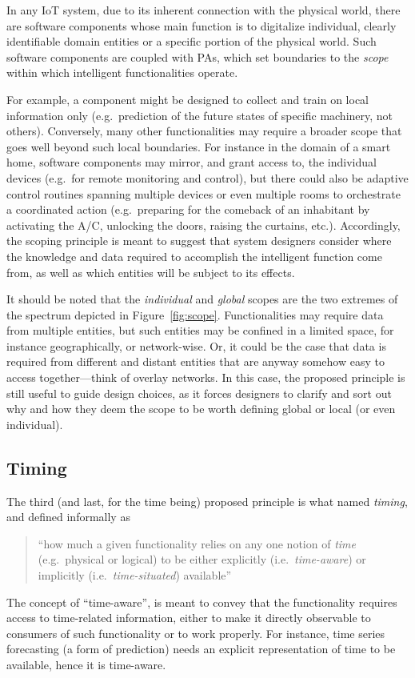 In any IoT system, due to its inherent connection with the physical world, there are software components whose main function 
is to digitalize individual, clearly identifiable domain entities or a specific portion of the physical world. 
Such software components 
are coupled with PAs, which set boundaries to the \emph{scope} within which intelligent functionalities operate. 

For example, a component might be designed to collect and train on local information only (e.g.\ prediction of the future states of specific machinery, not others). 
%
Conversely, many other functionalities may require a broader scope that goes well beyond such local boundaries. 
For instance in the domain of a smart home,
software components may mirror, and grant access to, the individual devices (e.g.\ for remote monitoring and control), 
but there could also be adaptive control routines spanning multiple devices or even multiple rooms to orchestrate a coordinated action (e.g.\ preparing for the comeback of an inhabitant by activating the A/C, unlocking the doors, raising the curtains, etc.). 
%
Accordingly, the scoping principle is meant to suggest that system designers consider where the knowledge and data required to accomplish the intelligent function come from, as well as which entities will be subject to its effects. 

It should be noted that the \emph{individual} and \emph{global} scopes are the two extremes of the spectrum depicted in Figure~\ref{fig:scope}. 
Functionalities may require data from multiple entities, but such entities may be confined in a limited space, for instance geographically, or network-wise. 
Or, it could be the case that data is required from different and distant entities that are anyway somehow easy to access together---think of overlay networks. 
%
In this case, the proposed principle is still useful to guide design choices, as it forces designers to clarify and sort out why and how they deem the scope to be worth defining global or local (or even individual). 

\subsection{Timing} 

The third (and last, for the time being) proposed principle is what named \emph{timing}, and defined informally as 
\begin{quote}
    ``how much a given functionality relies on any one notion of \emph{time} (e.g.\ physical or logical) to be either explicitly (i.e.\ \emph{time-aware}) or implicitly (i.e.\ \emph{time-situated}) available''
\end{quote}
%
The concept of ``time-aware'', is meant to convey that the functionality requires access to time-related information, either to make it directly observable to consumers of such functionality or to work properly. 
For instance, time series forecasting (a form of prediction) needs an explicit representation of time to be available, hence it is time-aware. 

